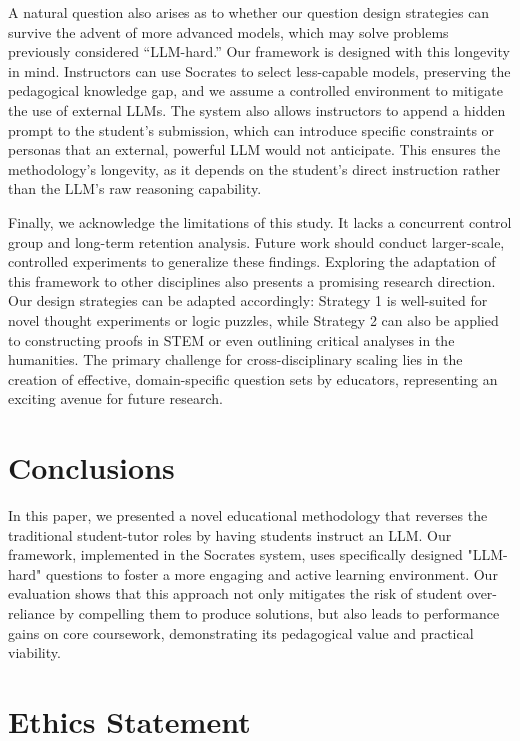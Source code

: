 \documentclass{article} %
\begin{document}
A natural question also arises as to whether our question design strategies can survive the advent of more advanced models, which may solve problems previously considered ``LLM-hard.'' Our framework is designed with this longevity in mind. Instructors can use \textsf{Socrates} to select less-capable models, preserving the pedagogical knowledge gap, and we assume a controlled environment to mitigate the use of external LLMs. The system also allows instructors to append a hidden prompt to the student's submission, which can introduce specific constraints or personas that an external, powerful LLM would not anticipate.  This ensures the methodology's longevity, as it depends on the student’s direct instruction rather than the LLM’s raw reasoning capability.

Finally, we acknowledge the limitations of this study. It lacks a concurrent control group and long-term retention analysis. Future work should conduct larger-scale, controlled experiments to generalize these findings. Exploring the adaptation of this framework to other disciplines also presents a promising research direction. Our design strategies can be adapted accordingly: Strategy 1 is well-suited for novel thought experiments or logic puzzles, while Strategy 2 can also be applied to constructing proofs in STEM or even outlining critical analyses in the humanities.  The primary challenge for cross-disciplinary scaling lies in the creation of effective, domain-specific question sets by educators, representing an exciting avenue for future research.

\section{Conclusions}
In this paper, we presented a novel educational methodology that reverses the traditional student-tutor roles by having students instruct an LLM. Our framework, implemented in the \textsf{Socrates} system, uses specifically designed "LLM-hard" questions to foster a more engaging and active learning environment. Our evaluation shows that this approach not only mitigates the risk of student over-reliance by compelling them to produce solutions, but also leads to performance gains on core coursework, demonstrating its pedagogical value and practical viability.









\section*{Ethics Statement}
\end{document}
